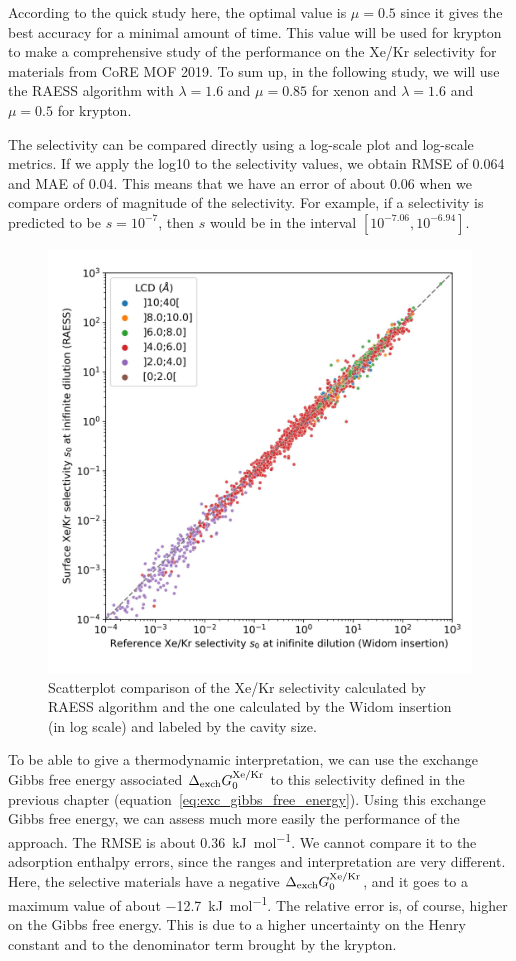 \documentclass[main]{subfiles}
\begin{document}
According to the quick study here, the optimal value is $\mu=0.5$ since it gives the best accuracy for a minimal amount of time. This value will be used for krypton to make a comprehensive study of the performance on the Xe/Kr selectivity for materials from CoRE MOF 2019. To sum up, in the following study, we will use the RAESS algorithm with $\lambda=1.6$ and $\mu=0.85$ for xenon and $\lambda=1.6$ and $\mu=0.5$ for krypton.

The selectivity can be compared directly using a log-scale plot and log-scale metrics. If we apply the log10 to the selectivity values, we obtain RMSE of 0.064 and MAE of 0.04. This means that we have an error of about 0.06 when we compare orders of magnitude of the selectivity. For example, if a selectivity is predicted to be $s = 10^{-7}$, then $s$ would be in the interval $[10^{-7.06},10^{-6.94}]$.

\begin{figure}[ht]
\centering
  \includegraphics[width=0.5\linewidth]{figures/3-fastsim/s_0_widom_vs_s_0_surface_zoom.jpg}
  \caption{Scatterplot comparison of the Xe/Kr selectivity calculated by RAESS algorithm and the one calculated by the Widom insertion (in log scale) and labeled by the cavity size. }\label{fgr:s_0}
\end{figure}

To be able to give a thermodynamic interpretation, we can use the exchange Gibbs free energy associated $\Delta_{\text{exch}}G_{\text{0}}^{\text{Xe/Kr}}$ to this selectivity defined in the previous chapter (equation~\ref{eq:exc_gibbs_free_energy}). Using this exchange Gibbs free energy, we can assess much more easily the performance of the approach. The RMSE is about \SI{0.36}{\kilo\joule\per\mole}. We cannot compare it to the adsorption enthalpy errors, since the ranges and interpretation are very different. Here, the selective materials have a negative $\Delta_{\text{exch}}G_{\text{0}}^{\text{Xe/Kr}}$, and it goes to a maximum value of about \SI{-12.7}{\kilo\joule\per\mole}. The relative error is, of course, higher on the Gibbs free energy. This is due to a higher uncertainty on the Henry constant and to the denominator term brought by the krypton.
\end{document}
